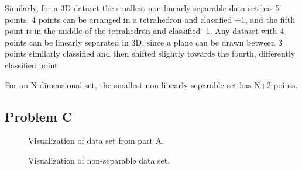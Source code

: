 \documentclass[12pt]{article} %
\begin{document}
Similarly, for a 3D dataset the smallest non-linearly-separable data set has 5 points. 4 points can be arranged in a tetrahedron and classified +1, and the fifth point is in the middle of the tetrahedron and classified -1. Any dataset with 4 points can be linearly separated in 3D, since a plane can be drawn between 3 points similarly classified and then shifted slightly towards the fourth, differently classified point.

For an N-dimensional set, the smallest non-linearly separable set has N+2 points.

\subsection{Problem C}
\vspace{-5mm}

\begin{figure}[H]
	\vspace{-15mm}
	\caption{Visualization of data set from part A.}
\end{figure}
\vspace{-5mm}
\begin{figure}[H]
	\vspace{-15mm}
	\caption{Visualization of non-separable data set.}
\end{figure}
\end{document}
